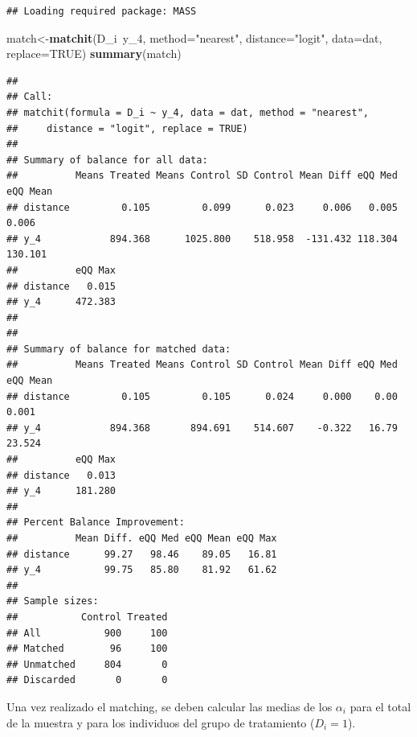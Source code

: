 \documentclass[]{article}
\newenvironment{Shaded}{\begin{snugshade}}{\end{snugshade}}
\newcommand{\KeywordTok}[1]{\textcolor[rgb]{0.13,0.29,0.53}{\textbf{{#1}}}}
\newcommand{\DataTypeTok}[1]{\textcolor[rgb]{0.13,0.29,0.53}{{#1}}}
\newcommand{\DecValTok}[1]{\textcolor[rgb]{0.00,0.00,0.81}{{#1}}}
\newcommand{\StringTok}[1]{\textcolor[rgb]{0.31,0.60,0.02}{{#1}}}
\newcommand{\CommentTok}[1]{\textcolor[rgb]{0.56,0.35,0.01}{\textit{{#1}}}}
\newcommand{\OtherTok}[1]{\textcolor[rgb]{0.56,0.35,0.01}{{#1}}}
\newcommand{\NormalTok}[1]{{#1}}
\begin{document}
\begin{verbatim}
## Loading required package: MASS
\end{verbatim}

\begin{Shaded}
\begin{Highlighting}[]
\NormalTok{match<-}\KeywordTok{matchit}\NormalTok{(D_i~y_4, }\DataTypeTok{method=}\StringTok{"nearest"}\NormalTok{, }\DataTypeTok{distance=}\StringTok{"logit"}\NormalTok{, }\DataTypeTok{data=}\NormalTok{dat, }\DataTypeTok{replace=}\OtherTok{TRUE}\NormalTok{)}
\KeywordTok{summary}\NormalTok{(match)}
\end{Highlighting}
\end{Shaded}

\begin{verbatim}
## 
## Call:
## matchit(formula = D_i ~ y_4, data = dat, method = "nearest", 
##     distance = "logit", replace = TRUE)
## 
## Summary of balance for all data:
##          Means Treated Means Control SD Control Mean Diff eQQ Med eQQ Mean
## distance         0.105         0.099      0.023     0.006   0.005    0.006
## y_4            894.368      1025.800    518.958  -131.432 118.304  130.101
##          eQQ Max
## distance   0.015
## y_4      472.383
## 
## 
## Summary of balance for matched data:
##          Means Treated Means Control SD Control Mean Diff eQQ Med eQQ Mean
## distance         0.105         0.105      0.024     0.000    0.00    0.001
## y_4            894.368       894.691    514.607    -0.322   16.79   23.524
##          eQQ Max
## distance   0.013
## y_4      181.280
## 
## Percent Balance Improvement:
##          Mean Diff. eQQ Med eQQ Mean eQQ Max
## distance      99.27   98.46    89.05   16.81
## y_4           99.75   85.80    81.92   61.62
## 
## Sample sizes:
##           Control Treated
## All           900     100
## Matched        96     100
## Unmatched     804       0
## Discarded       0       0
\end{verbatim}

Una vez realizado el matching, se deben calcular las medias de los
$\alpha_{i}$ para el total de la muestra y para los individuos del grupo
de tratamiento ($D_{i}=1$).

\begin{Shaded}
\end{Shaded}
\end{document}
